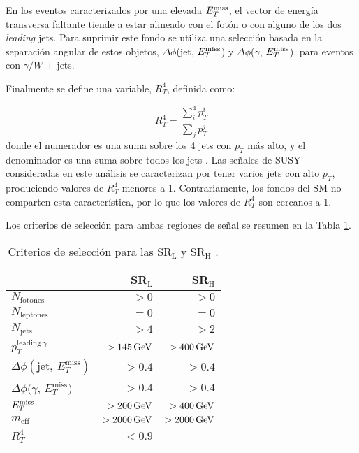 En los eventos caracterizados por una elevada $E_{T}^{\text{miss}}$, el vector de energía transversa faltante tiende a estar alineado con el fotón o con alguno de los dos \textit{leading} jets. Para suprimir este fondo se utiliza una selección basada en la separación angular de estos objetos, $\Delta\phi$(jet, $E_{T}^{\text{miss}}$) y $\Delta\phi$($\gamma$, $E_{T}^{\text{miss}}$), para eventos con $\gamma/W$ + jets.

Finalmente se define una variable, $R_{T}^{4}$, definida como:

\begin{equation}
R_{T}^{4}=\frac{\sum_{i}^{4}p_{T}^{i}}{\sum_{j}p_{T}^{j}}
\end{equation}
donde el numerador es una suma sobre los 4 jets con $p_{T}$ más alto, y el denominador es una suma sobre todos los jets \cite{Collaboration:2198651}. Las señales de SUSY consideradas en este análisis se caracterizan por tener varios jets con alto $p_{T}$, produciendo valores de $R_{T}^{4}$ menores a 1. Contrariamente, los fondos del SM no comparten esta característica, por lo que los valores de $R_{T}^{4}$ son cercanos a 1.

Los criterios de selección para ambas regiones de señal se resumen en la Tabla \ref{srs}.

\begin{table}
\centering
\caption{Criterios de selección para las SR$_{\text{L}}$ y SR$_{\text{H}}$ \cite{ATLAS:2016fks}.}
\begin{tabular}{ l | r | r }

	\hline

	& SR$_{\text{L}}$ & SR$_{\text{H}}$ \\

	\hline

	$N_{\text{fotones}}$ 	& $> 0$ 	& $> 0$ \\

	$N_{\text{leptones}}$ 	& $=0$ 	& $=0$ \\

	$N_{\text{jets}}$ 	& $>4$ 	& $>2$ \\

	$p_{T}^{\text{leading}\: \gamma}$ 	& $> 145 \, \mathrm{GeV}$ 	& $> 400 \, \mathrm{GeV}$ \\

	$\Delta\phi(\text{jet},\: E_{T}^{\text{miss}})$ 	& $> 0.4$ 	& $> 0.4$ \\

	$\Delta\phi(\gamma$,\: $E_{T}^{\text{miss}})$ 	& $>0.4$ 	& $>0.4$ \\

	$E_{T}^{\text{miss}}$ 	& $>200\, \mathrm{GeV}$ 	& $>400\, \mathrm{GeV}$ \\

	$m_{\text{eff}}$ 	& $> 2000 \, \mathrm{GeV}$ 	& $> 2000 \, \mathrm{GeV}$ \\

	$R_{T}^{4}$ 	& $< 0.9$ 	& - \\

	\hline


\end{tabular}
\label{srs}
\end{table}

